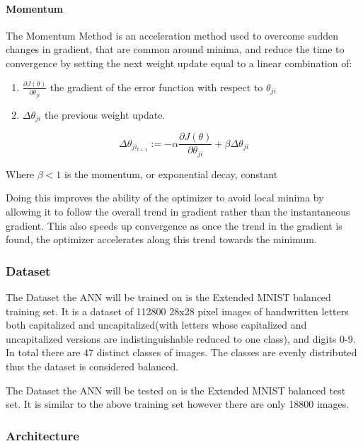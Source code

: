 \documentclass{article}
\begin{document}
\paragraph{Momentum}
The Momentum Method is an acceleration method \cite{backpropagationOriginal} used to overcome sudden changes in gradient, that are common around minima, and reduce the time to convergence by setting the next weight update equal to a linear combination of:
\begin{enumerate}
	\item $\frac{\partial{J}(\theta)}{\partial{\theta_{ji}}}$ the gradient of the error function with respect to $\theta_{ji}$
	\item $\Delta\theta_{ji}$ the previous weight update.
\end{enumerate}  
\begin{equation}
\Delta\theta_{ji_{t+1}} := -\alpha\frac{\partial{J}(\theta)}{\partial{\theta_{ji}}} + \beta\Delta\theta_{ji}
\end{equation}


 \hfill \newline
Where $\beta<1$ is the momentum, or exponential decay, constant 
 \hfill \newline
 
Doing this improves the ability of the optimizer to avoid local minima by allowing it to follow the overall trend in gradient rather than the instantaneous gradient. This also speeds up convergence as once the trend in the gradient is found, the optimizer accelerates along this trend towards the minimum.
\hfill\newpage

\subsubsection{Dataset}

The Dataset the ANN will be trained on is the Extended MNIST balanced training set. It is a dataset of 112800 28x28 pixel images of handwritten letters both capitalized and uncapitalized(with letters whose capitalized and uncapitalized versions are indistinguishable reduced to one class), and digits 0-9. In total there are 47 distinct classes of images. The classes are evenly distributed thus the dataset is considered balanced.

The Dataset the ANN will be tested on is the Extended MNIST balanced test set. It is similar to the above training set however there are only 18800 images.

\subsubsection{Architecture}
\end{document}
